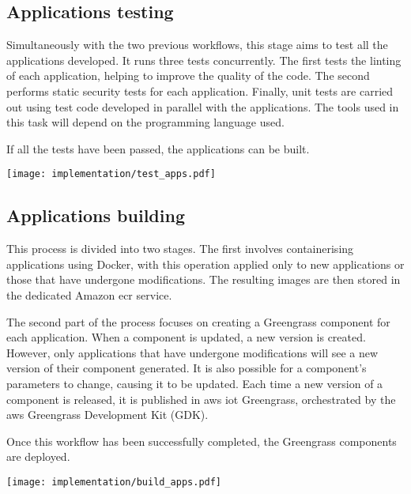 \subsection{Applications testing}
Simultaneously with the two previous workflows, this stage aims to test all the applications developed. It runs three tests concurrently. The first tests the linting of each application, helping to improve the quality of the code. The second performs static security tests for each application. Finally, unit tests are carried out using test code developed in parallel with the applications. The tools used in this task will depend on the programming language used.

If all the tests have been passed, the applications can be built.
\begin{center}
    \begingroup
    \texttt{[image: implementation/test\_apps.pdf]}
    \label{fig:test_apps}
    \endgroup
\end{center}

\subsection{Applications building}
This process is divided into two stages. The first involves containerising applications using Docker, with this operation applied only to new applications or those that have undergone modifications. The resulting images are then stored in the dedicated Amazon \acrshort{ecr} service.

The second part of the process focuses on creating a Greengrass component for each application. When a component is updated, a new version is created. However, only applications that have undergone modifications will see a new version of their component generated. It is also possible for a component's parameters to change, causing it to be updated. Each time a new version of a component is released, it is published in \gls{aws} \acrshort{iot} Greengrass, orchestrated by the \gls{aws} Greengrass Development Kit (GDK).

Once this workflow has been successfully completed, the Greengrass components are deployed.
\begin{center}
    \begingroup
    \texttt{[image: implementation/build\_apps.pdf]}
    \label{fig:build_apps}
    \endgroup
\end{center}


